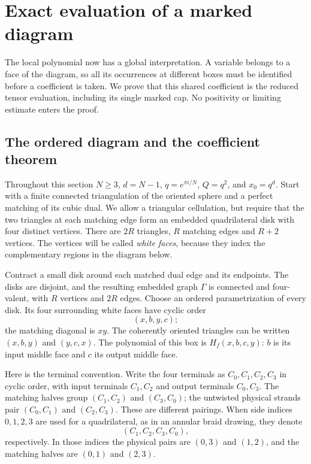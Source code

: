 \section{Exact evaluation of a marked diagram}
\label{de:section}

The local polynomial now has a global interpretation. A variable belongs
to a face of the diagram, so all its occurrences at different boxes
must be identified before a coefficient is taken. We prove that this
shared coefficient is the reduced tensor evaluation, including its
single marked cap. No positivity or limiting estimate enters the proof.

\subsection{The ordered diagram and the coefficient theorem}

Throughout this section \(N\ge3\), \(d=N-1\),
\(q=e^{\pi i/N}\), \(Q=q^2\), and \(x_0=q^d\).
Start with a finite connected triangulation of the oriented sphere and
a perfect matching of its cubic dual. We allow a triangular
cellulation, but require that the two triangles at each matching edge
form an embedded quadrilateral disk with four distinct vertices.
There are \(2R\) triangles, \(R\) matching edges and \(R+2\) vertices.
The vertices will be called \emph{white faces}, because they index the
complementary regions in the diagram below.

Contract a small disk around each matched dual edge and its endpoints.
The disks are disjoint, and the resulting embedded graph \(\Gamma\)
is connected and four-valent, with \(R\) vertices and \(2R\) edges.
Choose an ordered parametrization of every disk. Its four surrounding
white faces have cyclic order
\[
                         (x,b,y,c);
\]
the matching diagonal is \(xy\). The coherently oriented triangles
can be written \((x,b,y)\) and \((y,c,x)\). The polynomial of this box
is \(H_f(x,b,c,y)\): \(b\) is its input middle face and \(c\) its
output middle face.

Here is the terminal convention. Write the four terminals as
\(C_0,C_1,C_2,C_3\) in cyclic order, with input terminals
\(C_1,C_2\) and output terminals \(C_0,C_3\). The matching halves
group \((C_1,C_2)\) and \((C_3,C_0)\); the untwisted physical
strands pair \((C_0,C_1)\) and \((C_2,C_3)\). These are different
pairings. When side indices \(0,1,2,3\) are used for a quadrilateral,
as in an annular braid drawing, they denote
\[
                 (C_1,C_2,C_3,C_0),
\]
respectively. In those indices the physical pairs are \((0,3)\)
and \((1,2)\), and the matching halves are \((0,1)\) and \((2,3)\).

